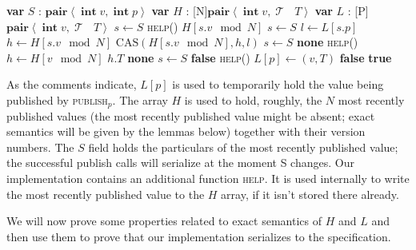 \documentclass[a4paper,11pt]{article}
\def\none{\textbf{none} }
\def\T{\ensuremath{\operatorname{\mathcal{T}}}\text{ }}
\def\int{\ensuremath{\operatorname{\textbf{int}}}}
\newcommand{\fn}[1]{\textsc{#1}}
\newcommand{\var}[2]{\textbf{var }#1 : #2}
\newcommand{\arrayspec}[1]{\text{array}[#1]\text{ of }}
\begin{document}
\begin{algorithmic}[1]
	\State\var{$S$}{$\textbf{pair}\left<\int v, \int p\right>$} 
	\State\var{$H$}{\arrayspec{N}$\textbf{pair}\left<\int v, \T T\right>$} 
	\State\var{$L$}{\arrayspec{P}$\textbf{pair}\left<\int v, \T T\right>$} 
		\State $s \gets S$ 
		\State \fn{help}()
		\State \Return $H[s.v \mod N]$
	\EndFunction
		\State $s \gets S$
		\State $l \gets L[s.p]$
		\State $h \gets H[s.v \mod N]$
		\State $\text{CAS}(H[s.v \mod N], h, l)$ \label{hist-help-cas}
		\EndIf
	\EndFunction
		\State $s \gets S$ \label{hist-get-notyet-sp} 
		\State \Return \none \label{hist-get-notyet} 
		\EndIf
		\State \fn{help}()
		\State $h \gets H[v \mod N]$
			\State \Return $h.T$
		\Else
			\State \Return \none \label{hist-get-tooold}
		\EndIf
	\EndFunction
		\State $s \gets S$ \label{hist-pub-earlier-sp} 
			\State \Return \textbf{false} \label{hist-pub-earlier-exit}
		\EndIf
		\State \fn{help}()
		\State $L[p] \gets (v, T)$ \label{hist-pub-latest}
		 \label{hist-pub-later-sp}
			\State \Return \textbf{false}
		\EndIf
		\State \Return \textbf{true}
	\EndFunction
\end{algorithmic}

As the comments indicate, $L[p]$ is used to temporarily hold the value being published by \fn{publish$_p$}. The array $H$ is used to hold, roughly,
the $N$ most recently published values (the most recently published value might be absent; exact semantics will be given by the lemmas below) together with their version numbers. The $S$ field holds the particulars of the most recently published value; the successful publish calls will serialize at the moment S changes. Our implementation contains an additional function \fn{help}. It is used internally to write the most recently published value to the $H$ array, if it isn't stored there already.

We will now prove some properties related to exact semantics of $H$ and $L$ and then use them to prove that our implementation serializes to the specification.
\end{document}
